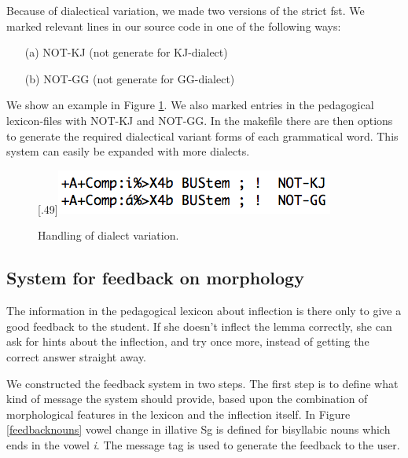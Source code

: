 \documentclass[11pt]{article}
\begin{document}
Because of dialectical variation, we made two versions of the strict fst. We marked relevant lines in our source code in one of the following ways:

\begin{example}\label{ped}
\begin{itemize}
\item[(a)] NOT-KJ (not generate for KJ-dialect) 
\item[(b)] NOT-GG (not generate for GG-dialect)  
\end{itemize}
\end{example}

We show an example in Figure \ref{smelex}. We also marked entries in the pedagogical lexicon-files with NOT-KJ and NOT-GG. In the makefile there are then options to generate the required dialectical variant forms of each grammatical word. This system can easily be expanded with more dialects.


\begin{figure}[htbp]
\begin{center}
\scalebox{.49}[.49]{\includegraphics{presentation/img/smelex3.png}}\\
\caption{Handling of dialect variation.}
\label{smelex}
\end{center}
\end{figure}

\subsection{System for feedback on morphology}\label{mfeedback}

The information in the pedagogical lexicon about inflection is there only to give a good feedback to the student. If she doesn't inflect the lemma correctly, she can ask for hints about the inflection, and try once more, instead of getting the correct answer straight away. 

We constructed the feedback system in two steps. The first step is to define what kind of message the system should provide, based upon the combination of morphological features in the lexicon and the inflection itself. In Figure \ref{feedbacknouns} vowel change in illative Sg is defined for bisyllabic nouns which ends in the vowel \textit{i}. The message tag is used to generate the feedback to the user. 
\end{document}
